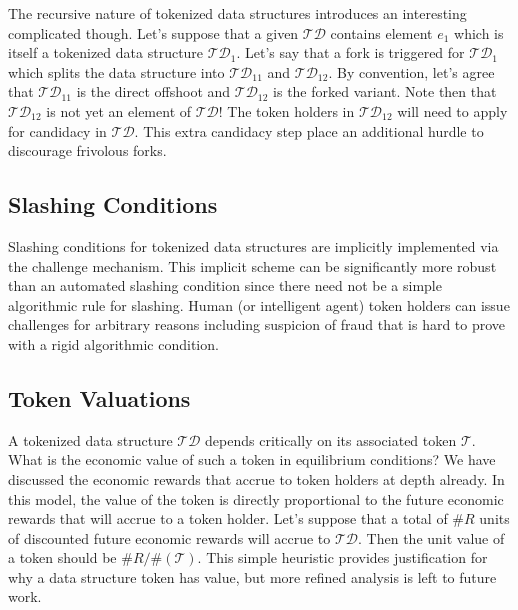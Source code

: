 \documentclass{llncs}
\begin{document}
The recursive nature of tokenized data structures introduces an interesting complicated though. Let's suppose that a given $\mathcal{TD}$ contains element $e_1$ which is itself a tokenized data structure $\mathcal{TD}_1$. Let's say that a fork is triggered for $\mathcal{TD}_1$ which splits the data structure into $\mathcal{TD}_{11}$ and $\mathcal{TD}_{12}$. By convention, let's agree that $\mathcal{TD}_{11}$ is the direct offshoot and $\mathcal{TD}_{12}$ is the forked variant. Note then that $\mathcal{TD}_{12}$ is not yet an element of $\mathcal{TD}$! The token holders in $\mathcal{TD}_{12}$ will need to apply for candidacy in $\mathcal{TD}$. This extra candidacy step place an additional hurdle to discourage frivolous forks.


\subsection{Slashing Conditions}

Slashing conditions for tokenized data structures are implicitly implemented via the challenge mechanism. This implicit scheme can be significantly more robust than an automated slashing condition since there need not be a simple algorithmic rule for slashing. Human (or intelligent agent) token holders can issue challenges for arbitrary reasons including suspicion of fraud that is hard to prove with a rigid algorithmic condition.

\subsection{Token Valuations}

A tokenized data structure $\mathcal{TD}$ depends critically on its associated token $\mathcal{T}$. What is the economic value of such a token in equilibrium conditions? We have discussed the economic rewards that accrue to token holders at depth already. In this model, the value of the token is directly proportional to the future economic rewards that will accrue to a token holder. Let's suppose that a total of $\#R$ units of discounted future economic rewards will accrue to $\mathcal{TD}$. Then the unit value of a token should be $\#R/\#(\mathcal{T})$. This simple heuristic provides justification for why a data structure token has value, but more refined analysis is left to future work.



\begin{comment}
\section{Open Design Questions}

\begin{itemize}
\item Challenge Escalation: If $\text{Challenge} == \text{True}$ and $\text{challengeDeposit} < \text{forkThreshold}$, then re-enter a voting period similar to the initial Data Curation workflow above. Challenges are allowed with escalating challengeDeposit amounts until $\text{challengeDeposit} > \text{forkThreshold}$.
\end{itemize}
\end{comment}
\end{document}
